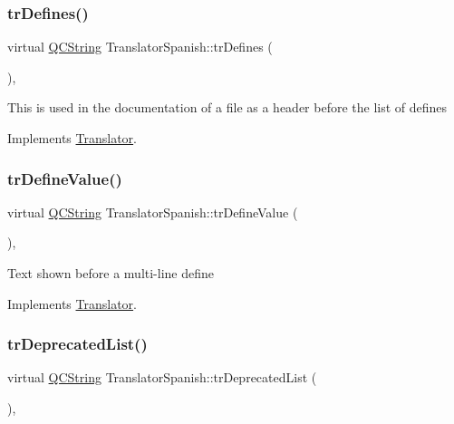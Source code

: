 \subsubsection{\texorpdfstring{trDefines()}{trDefines()}}
{\footnotesize\ttfamily virtual \mbox{\hyperlink{class_q_c_string}{Q\+C\+String}} Translator\+Spanish\+::tr\+Defines (\begin{DoxyParamCaption}{ }\end{DoxyParamCaption})\hspace{0.3cm}{\ttfamily [inline]}, {\ttfamily [virtual]}}

This is used in the documentation of a file as a header before the list of defines 

Implements \mbox{\hyperlink{class_translator}{Translator}}.

\mbox{\label{class_translator_spanish_afe12ea704c8ac0900c3018ee64576f46}} 
\subsubsection{\texorpdfstring{trDefineValue()}{trDefineValue()}}
{\footnotesize\ttfamily virtual \mbox{\hyperlink{class_q_c_string}{Q\+C\+String}} Translator\+Spanish\+::tr\+Define\+Value (\begin{DoxyParamCaption}{ }\end{DoxyParamCaption})\hspace{0.3cm}{\ttfamily [inline]}, {\ttfamily [virtual]}}

Text shown before a multi-\/line define 

Implements \mbox{\hyperlink{class_translator}{Translator}}.

\mbox{\label{class_translator_spanish_aedc06426e0baf70df8d3d286624e29a9}} 
\subsubsection{\texorpdfstring{trDeprecatedList()}{trDeprecatedList()}}
{\footnotesize\ttfamily virtual \mbox{\hyperlink{class_q_c_string}{Q\+C\+String}} Translator\+Spanish\+::tr\+Deprecated\+List (\begin{DoxyParamCaption}{ }\end{DoxyParamCaption})\hspace{0.3cm}{\ttfamily [inline]}, {\ttfamily [virtual]}}

